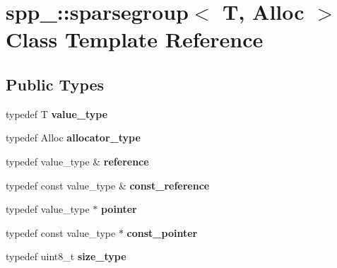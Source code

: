 \hypertarget{classspp___1_1sparsegroup}{}\section{spp\+\_\+\+:\+:sparsegroup$<$ T, Alloc $>$ Class Template Reference}
\label{classspp___1_1sparsegroup}
\subsection*{Public Types}
\begin{DoxyCompactItemize}
\item 
typedef T {\bfseries value\+\_\+type}\hypertarget{classspp___1_1sparsegroup_a864fefcef8a7692b3a5f3c02c4eacaeb}{}\label{classspp___1_1sparsegroup_a864fefcef8a7692b3a5f3c02c4eacaeb}

\item 
typedef Alloc {\bfseries allocator\+\_\+type}\hypertarget{classspp___1_1sparsegroup_a580a36efa612b0d10cced0fba87db4b5}{}\label{classspp___1_1sparsegroup_a580a36efa612b0d10cced0fba87db4b5}

\item 
typedef value\+\_\+type \& {\bfseries reference}\hypertarget{classspp___1_1sparsegroup_a34aeb4b4b610562a1d3c1e2d4920ef93}{}\label{classspp___1_1sparsegroup_a34aeb4b4b610562a1d3c1e2d4920ef93}

\item 
typedef const value\+\_\+type \& {\bfseries const\+\_\+reference}\hypertarget{classspp___1_1sparsegroup_af257223824a24bd24744ff49edd51005}{}\label{classspp___1_1sparsegroup_af257223824a24bd24744ff49edd51005}

\item 
typedef value\+\_\+type $\ast$ {\bfseries pointer}\hypertarget{classspp___1_1sparsegroup_ac7fad18240bb16791adfa069876e2bd7}{}\label{classspp___1_1sparsegroup_ac7fad18240bb16791adfa069876e2bd7}

\item 
typedef const value\+\_\+type $\ast$ {\bfseries const\+\_\+pointer}\hypertarget{classspp___1_1sparsegroup_ac5de16c5f7bff2a00f1ba2f5ea1736a9}{}\label{classspp___1_1sparsegroup_ac5de16c5f7bff2a00f1ba2f5ea1736a9}

\item 
typedef uint8\+\_\+t {\bfseries size\+\_\+type}\hypertarget{classspp___1_1sparsegroup_abce7d32df28b0f182a7405d2b58e5cdd}{}\label{classspp___1_1sparsegroup_abce7d32df28b0f182a7405d2b58e5cdd}


\end{DoxyCompactItemize}
